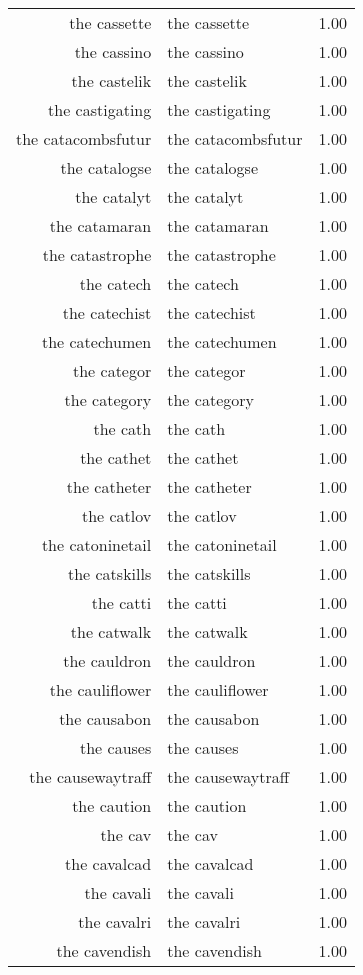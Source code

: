 \begin{table}[ht]
\begin{tabular}{rlr}
  the cassette & the cassette & 1.00 \\ 
  the cassino & the cassino & 1.00 \\ 
  the castelik & the castelik & 1.00 \\ 
  the castigating & the castigating & 1.00 \\ 
  the catacombsfutur & the catacombsfutur & 1.00 \\ 
  the catalogse & the catalogse & 1.00 \\ 
  the catalyt & the catalyt & 1.00 \\ 
  the catamaran & the catamaran & 1.00 \\ 
  the catastrophe & the catastrophe & 1.00 \\ 
  the catech & the catech & 1.00 \\ 
  the catechist & the catechist & 1.00 \\ 
  the catechumen & the catechumen & 1.00 \\ 
  the categor & the categor & 1.00 \\ 
  the category & the category & 1.00 \\ 
  the cath & the cath & 1.00 \\ 
  the cathet & the cathet & 1.00 \\ 
  the catheter & the catheter & 1.00 \\ 
  the catlov & the catlov & 1.00 \\ 
  the catoninetail & the catoninetail & 1.00 \\ 
  the catskills & the catskills & 1.00 \\ 
  the catti & the catti & 1.00 \\ 
  the catwalk & the catwalk & 1.00 \\ 
  the cauldron & the cauldron & 1.00 \\ 
  the cauliflower & the cauliflower & 1.00 \\ 
  the causabon & the causabon & 1.00 \\ 
  the causes & the causes & 1.00 \\ 
  the causewaytraff & the causewaytraff & 1.00 \\ 
  the caution & the caution & 1.00 \\ 
  the cav & the cav & 1.00 \\ 
  the cavalcad & the cavalcad & 1.00 \\ 
  the cavali & the cavali & 1.00 \\ 
  the cavalri & the cavalri & 1.00 \\ 
  the cavendish & the cavendish & 1.00 \\ 

\end{tabular}
\end{table}
